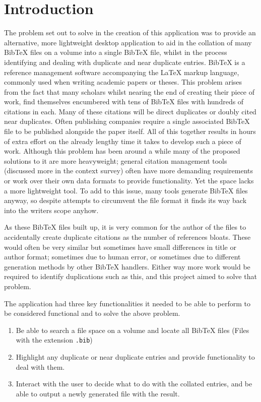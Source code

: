 \documentclass[a4paper,11pt]{article}
\newcommand{\code}[1]{\colorbox{codegray}{\texttt{#1}}}
\begin{document}
\section{Introduction}
The problem set out to solve in the creation of this application was to provide an alternative, more lightweight desktop application to aid in the collation of many BibTeX files on a volume into a single BibTeX file, whilst in the process identifying and dealing with duplicate and near duplicate entries. BibTeX is a reference management software accompanying the LaTeX markup language, commonly used when writing academic papers or theses. This problem arises from the fact that many scholars whilst nearing the end of creating their piece of work, find themselves encumbered with tens of BibTeX files with hundreds of citations in each. Many of these citations will be direct duplicates or doubly cited near duplicates. Often publishing companies require a single associated BibTeX file to be published alongside the paper itself. All of this together results in hours of extra effort on the already lengthy time it takes to develop such a piece of work. Although this problem has been around a while many of the proposed solutions to it are more heavyweight; general citation management tools (discussed more in the context survey) often have more demanding requirements or work over their own data formats to provide functionality. Yet the space lacks a more lightweight tool. To add to this issue, many tools generate BibTeX files anyway, so despite attempts to circumvent the file format it finds its way back into the writers scope anyhow.

As these BibTeX files built up, it is very common for the author of the files to accidentally create duplicate citations as the number of references bloats. These would often be very similar but sometimes have small differences in title or author format; sometimes due to human error, or sometimes due to different generation methods by other BibTeX handlers. Either way more work would be required to identify duplications such as this, and this project aimed to solve that problem.

The application had three key functionalities it needed to be able to perform to be considered functional and to solve the above problem.
\begin{enumerate}
    \item Be able to search a file space on a volume and locate all BibTeX files (Files with the extension \code{.bib})
    \item Highlight any duplicate or near duplicate entries and provide functionality to deal with them.
    \item Interact with the user to decide what to do with the collated entries, and be able to output a newly generated file with the result.
\end{enumerate}
\end{document}
